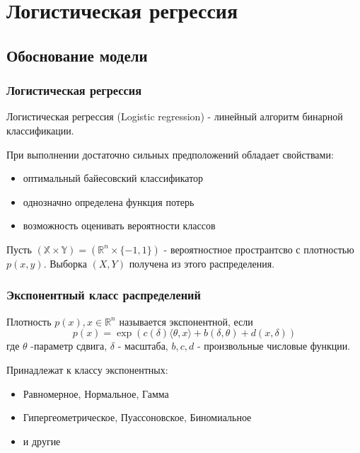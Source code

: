 \documentclass{beamer}
\begin{document}
	\section{Логистическая регрессия}
	
	\subsection{Обоснование модели}
	
	\begin{frame}
		\frametitle{Логистическая регрессия}
		Логистическая регрессия (Logistic regression) - линейный алгоритм бинарной классификации.
		
		\vspace{15pt}
		
		При выполнении достаточно сильных предположений обладает свойствами:
		\begin{itemize}
			\item оптимальный байесовский классификатор
			\item однозначно определена функция потерь
			\item возможность оценивать вероятности классов
		\end{itemize}
		
		\vspace{15pt}
		
		Пусть $(\mathbb{X}\times \mathbb{Y}) = (\mathbb{R}^{n} \times \{-1, 1\})$ - вероятностное пространтсво с плотностью $p(x, y)$. Выборка $(X, Y)$ получена из этого распределения.
	\end{frame}
	
	\begin{frame}
		\frametitle{Экспонентный класс распределений}
		Плотность $p(x), x \in \mathbb{R}^{n}$ называется экспонентной, если
		\[
		p(x) = \exp(c(\delta) \langle \theta, x \rangle + b(\delta, \theta) + d(x, \delta))
		\]
		где $\theta$ -параметр сдвига, $\delta$ - масштаба, $b, c, d$ - произвольные числовые функции.
		
		\vspace{15pt}
		
		Принадлежат к классу экспонентных:
		\begin{itemize}
			\item Равномерное, Нормальное, Гамма
			\item Гипергеометрическое, Пуассоновское, Биномиальное
			\item и другие
		\end{itemize}
	\end{frame}
	
\end{document}
